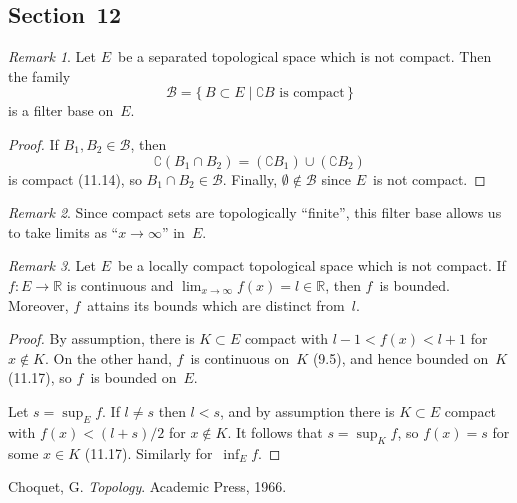 \documentclass[letterpaper,12pt]{article}
\newcommand{\R}{\mathbb{R}}
\newcommand{\B}{\mathcal{B}}
\newcommand{\union}{\cup}
\newcommand{\sect}{\cap}
\theoremstyle{definition}
\theoremstyle{remark}
\newtheorem*{rmk}{Remark}
\begin{document}
\subsection*{Section~12}
\begin{rmk}
Let \(E\)~be a separated topological space which is not compact. Then the family
\[\B=\{\,B\subset E\mid\complement B\text{ is compact}\,\}\]
is a filter base on~\(E\).
\end{rmk}
\begin{proof}
If \(B_1,B_2\in\B\), then
\[\complement(B_1\sect B_2)=(\complement B_1)\union(\complement B_2)\]
is compact (11.14), so \(B_1\sect B_2\in\B\). Finally, \(\emptyset\not\in\B\) since \(E\)~is not compact.
\end{proof}
\begin{rmk}
Since compact sets are topologically ``finite'', this filter base allows us to take limits as ``\(x\to\infty\)'' in~\(E\).
\end{rmk}

\begin{rmk}
Let \(E\)~be a locally compact topological space which is not compact. If \(f:E\to\R\) is continuous and \(\lim_{x\to\infty}f(x)=l\in\R\), then \(f\)~is bounded. Moreover, \(f\)~attains its bounds which are distinct from~\(l\).
\end{rmk}
\begin{proof}
By assumption, there is \(K\subset E\) compact with \(l-1<f(x)<l+1\) for \(x\not\in K\). On the other hand, \(f\)~is continuous on~\(K\) (9.5), and hence bounded on~\(K\) (11.17), so \(f\)~is bounded on~\(E\).

Let \(s=\sup_E f\). If \(l\ne s\) then \(l<s\), and by assumption there is \(K\subset E\) compact with \(f(x)<(l+s)/2\) for \(x\not\in K\). It follows that \(s=\sup_K f\), so \(f(x)=s\) for some \(x\in K\) (11.17). Similarly for~\(\inf_E f\).
\end{proof}

\newpage
\begin{thebibliography}{0}
 Choquet, G. \textit{Topology}. Academic Press, 1966.
\end{thebibliography}
\end{document}
